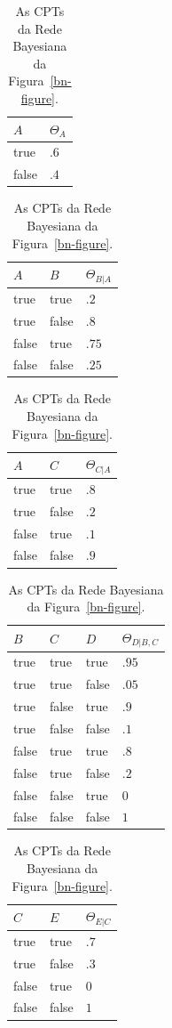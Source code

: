 \documentclass{amsart}
\theoremstyle{plain}
\numberwithin{equation}{subsection}
\begin{document}
\begin{table}[h]
  \begin{center}
    \begin{tabular}{l | l}
      $A$ & $\Theta_A$\\
      \hline
      true & $.6$ \\
      false & $.4$ \\
    \end{tabular}
    \begin{tabular}{l l | l}
      $A$ & $B$ & $\Theta_{B|A}$\\
      \hline
      true & true & $.2$ \\
      true & false & $.8$ \\
      false & true & $.75$ \\
      false & false & $.25$ \\
    \end{tabular}
    \begin{tabular}{l l | l}
      $A$ & $C$ & $\Theta_{C|A}$ \\
      \hline
      true & true & $.8$ \\
      true & false & $.2$ \\
      false & true & $.1$ \\
      false & false & $.9$ \\
    \end{tabular}
    \begin{tabular}{l l l | l}
      $B$ & $C$ & $D$ & $\Theta_{D|B,C}$ \\
      \hline
      true & true & true & $.95$ \\
      true & true & false & $.05$ \\
      true & false & true & $.9$ \\
      true & false & false & $.1$ \\
      false & true & true & $.8$ \\
      false & true & false & $.2$ \\
      false & false & true & $0$ \\
      false & false & false & $1$ \\
    \end{tabular}
    \begin{tabular}{l l | l}
      $C$ & $E$ & $\Theta_{E|C}$ \\
      \hline
      true & true & $.7$ \\
      true & false & $.3$ \\
      false & true & $0$ \\
      false & false & $1$ \\
    \end{tabular}
  \end{center}
  \caption{As CPTs da Rede Bayesiana da Figura~\ref{bn-figure}.}
\end{table}
\end{document}

